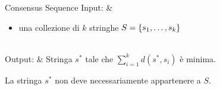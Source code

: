 \begin{problem}[lined]{Consensus Sequence}
    Input: & \begin{minipage}[t]{0.8\linewidth}\begin{itemize}
        \setlength\itemsep{0em}
        \item una collezione di $k$ stringhe $S = \left\{s_1, \ldots, s_k\right\}$
    \end{itemize}\end{minipage}\\
    Output: & Stringa $s^*$ tale che $\sum\limits_{i=1}^k d(s^*, s_i)$ è minima.
\end{problem}

La stringa $s^*$ non deve necessariamente appartenere a $S$. 